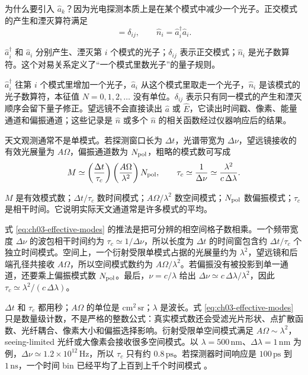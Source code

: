 为什么要引入 \(\hat a_k\)？因为光电探测本质上是在某个模式中减少一个光子。正交模式的产生和湮灭算符满足
\begin{equation}
  [\hat a_i,\hat a_j^\dagger]=\delta_{ij},\qquad
  \hat n_i=\hat a_i^\dagger\hat a_i .
  \label{eq:ch03-commutator}
\end{equation}
\begin{formulaexplain}
\(\hat a_i^\dagger\) 和 \(\hat a_i\) 分别产生、湮灭第 \(i\) 个模式的光子；\(\delta_{ij}\) 表示正交模式；\(\hat n_i\) 是光子数算符。这个对易关系定义了“一个模式里数光子”的量子规则。
\end{formulaexplain}
\(\hat a_i^\dagger\) 往第 \(i\) 个模式里增加一个光子，\(\hat a_i\) 从这个模式里取走一个光子，\(\hat n_i\) 是该模式的光子数算符，本征值 \(N=0,1,2,\ldots\) 没有单位。\(\delta_{ij}\) 表示只有同一模式的产生和湮灭顺序会留下量子修正。望远镜不会直接读出 \(\hat a\) 或 \(\hat E\)，它读出时间戳、像素、能量通道和偏振通道；这些记录是 \(\hat n\) 或多个 \(\hat n\) 的相关函数经过仪器响应后的结果。

天文观测通常不是单模式。若探测窗口长为 \(\Delta t\)，光谱带宽为 \(\Delta\nu\)，望远镜接收的有效光展量为 \(A\Omega\)，偏振通道数为 \(N_{\rm pol}\)，粗略的模式数可写成
\begin{equation}
  M \simeq
  \left(\frac{\Delta t}{\tau_c}\right)
  \left(\frac{A\Omega}{\lambda^2}\right)
  N_{\rm pol},
  \qquad
  \tau_c\simeq\frac{1}{\Delta\nu}\simeq\frac{\lambda^2}{c\,\Delta\lambda}.
  \label{eq:ch03-effective-modes}
\end{equation}
\begin{formulaexplain}
\(M\) 是有效模式数；\(\Delta t/\tau_c\) 数时间模式；\(A\Omega/\lambda^2\) 数空间模式；\(N_{\rm pol}\) 数偏振模式；\(\tau_c\) 是相干时间。它说明实际天文通道常是许多模式的平均。
\end{formulaexplain}
式 \eqref{eq:ch03-effective-modes} 的推法是把可分辨的相空间格子数相乘。一个频带宽度 \(\Delta\nu\) 的波包相干时间约为 \(\tau_c\simeq1/\Delta\nu\)，所以长度为 \(\Delta t\) 的时间窗包含约 \(\Delta t/\tau_c\) 个独立时间模式。空间上，一个衍射受限单模式占据的光展量约为 \(\lambda^2\)，望远镜和后端孔径共接收 \(A\Omega\)，所以空间模式数约为 \(A\Omega/\lambda^2\)。若偏振没有被投影到单一通道，还要乘上偏振模式数 \(N_{\rm pol}\)。最后，\(\nu=c/\lambda\) 给出 \(\Delta\nu\simeq c\,\Delta\lambda/\lambda^2\)，因此 \(\tau_c\simeq\lambda^2/(c\,\Delta\lambda)\)。

\(\Delta t\) 和 \(\tau_c\) 都用秒；\(A\Omega\) 的单位是 \(\mathrm{cm^2\,sr}\)；\(\lambda\) 是波长。式 \eqref{eq:ch03-effective-modes} 只是数量级计数，不是严格的整数公式：真实模式数还会受滤光片形状、点扩散函数、光纤耦合、像素大小和偏振选择影响。衍射受限单空间模式满足 \(A\Omega\sim\lambda^2\)，seeing-limited 光纤或大像素会接收很多空间模式。以 \(\lambda=500\,\mathrm{nm}\)、\(\Delta\lambda=1\,\mathrm{nm}\) 为例，\(\Delta\nu\simeq1.2\times10^{12}\,\mathrm{Hz}\)，所以 \(\tau_c\) 只有约 \(0.8\,\mathrm{ps}\)。若探测器时间响应是 \(100\,\mathrm{ps}\) 到 \(1\,\mathrm{ns}\)，一个时间 bin 已经平均了上百到上千个时间模式 \citep{2000stop.book.....G,1956Natur.177...27B,1957RSPSA.242..300B,1974iiia.book.....H}。

